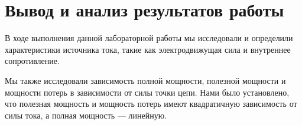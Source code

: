 \section{Вывод и анализ результатов работы}
В ходе выполнения данной лабораторной работы
мы исследовали и определили характеристики источника тока, такие как
электродвижущая сила и внутреннее сопротивление.

Мы также исследовали зависимость полной мощности, полезной мощности
и мощности потерь в зависимости от силы точки цепи.
Нами было установлено, что полезная мощность и мощность потерь
имеют квадратичную зависимость от силы тока,
а полная мощность --- линейную.

